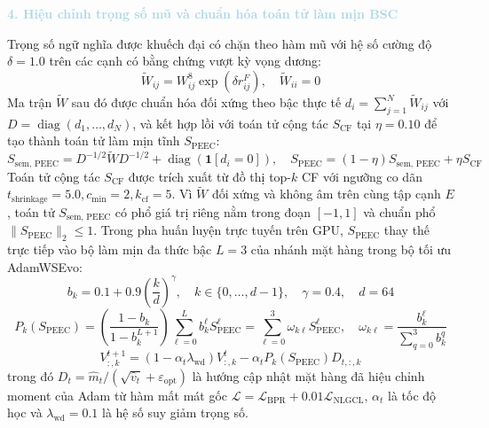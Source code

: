 \noindent\textcolor{lightblue}{\textbf{4. Hiệu chỉnh trọng số mũ và chuẩn hóa toán tử làm mịn BSC}}

Trọng số ngữ nghĩa được khuếch đại có chặn theo hàm mũ với hệ số cường độ $\delta = 1.0$ trên các cạnh có bằng chứng vượt kỳ vọng dương:
\begin{equation}
\widetilde{W}_{ij} = W_{ij}^8 \exp(\delta r_{ij}^F), \quad \widetilde{W}_{ii} = 0
\end{equation}
Ma trận $\widetilde{W}$ sau đó được chuẩn hóa đối xứng theo bậc thực tế $d_i = \sum_{j=1}^{N} \widetilde{W}_{ij}$ với $D = \operatorname{diag}(d_1, \ldots, d_N)$, và kết hợp lồi với toán tử cộng tác $S_{\text{CF}}$ tại $\eta = 0.10$ để tạo thành toán tử làm mịn tĩnh $S_{\text{PEEC}}$:
\begin{equation}
S_{\text{sem, PEEC}} = D^{-1/2} \widetilde{W} D^{-1/2} + \operatorname{diag}(\mathbf{1}[d_i = 0]), \quad S_{\text{PEEC}} = (1 - \eta) S_{\text{sem, PEEC}} + \eta S_{\text{CF}}
\end{equation}
Toán tử cộng tác $S_{\text{CF}}$ được trích xuất từ đồ thị top-$k$ CF với ngưỡng co dãn $t_{\text{shrinkage}} = 5.0, c_{\text{min}} = 2, k_{\text{cf}} = 5$. Vì $\widetilde{W}$ đối xứng và không âm trên cùng tập cạnh $E$, toán tử $S_{\text{sem, PEEC}}$ có phổ giá trị riêng nằm trong đoạn $[-1, 1]$ và chuẩn phổ $\|S_{\text{PEEC}}\|_2 \le 1$. Trong pha huấn luyện trực tuyến trên GPU, $S_{\text{PEEC}}$ thay thế trực tiếp vào bộ làm mịn đa thức bậc $L = 3$ của nhánh mặt hàng trong bộ tối ưu AdamWSEvo:
\begin{equation}
b_k = 0.1 + 0.9 \left(\frac{k}{d}\right)^\gamma, \quad k \in \{0, \ldots, d-1\}, \quad \gamma = 0.4, \quad d = 64
\end{equation}
\begin{equation}
P_k(S_{\text{PEEC}}) = \left( \frac{1 - b_k}{1 - b_k^{L+1}} \right) \sum_{\ell=0}^{L} b_k^\ell S_{\text{PEEC}}^\ell = \sum_{\ell=0}^{3} \omega_{k\ell} S_{\text{PEEC}}^\ell, \quad \omega_{k\ell} = \frac{b_k^\ell}{\sum_{q=0}^{3} b_k^q}
\end{equation}
\begin{equation}
V_{:, k}^{t+1} = (1 - \alpha_t \lambda_{\text{wd}}) V_{:, k}^t - \alpha_t P_k(S_{\text{PEEC}}) D_{t, :, k}
\end{equation}
trong đó $D_t = \widehat{m}_t / (\sqrt{\widehat{v}_t} + \varepsilon_{\text{opt}})$ là hướng cập nhật mặt hàng đã hiệu chỉnh moment của Adam từ hàm mất mát gốc $\mathcal{L} = \mathcal{L}_{\text{BPR}} + 0.01\mathcal{L}_{\text{NLGCL}}$, $\alpha_t$ là tốc độ học và $\lambda_{\text{wd}} = 0.1$ là hệ số suy giảm trọng số.

